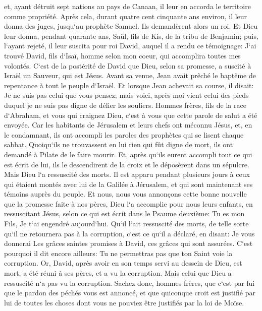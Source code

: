 \verse et, ayant détruit sept nations au pays de Canaan, il leur en accorda le territoire comme propriété. 
\verse Après cela, durant quatre cent cinquante ans environ, il leur donna des juges, jusqu`au prophète Samuel. 
\verse Ils demandèrent alors un roi. Et Dieu leur donna, pendant quarante ans, Saül, fils de Kis, de la tribu de Benjamin; 
\verse puis, l`ayant rejeté, il leur suscita pour roi David, auquel il a rendu ce témoignage: J`ai trouvé David, fils d`Isaï, homme selon mon coeur, qui accomplira toutes mes volontés. 
\verse C`est de la postérité de David que Dieu, selon sa promesse, a suscité à Israël un Sauveur, qui est Jésus. 
\verse Avant sa venue, Jean avait prêché le baptême de repentance à tout le peuple d`Israël. 
\verse Et lorsque Jean achevait sa course, il disait: Je ne suis pas celui que vous pensez; mais voici, après moi vient celui des pieds duquel je ne suis pas digne de délier les souliers. 
\verse Hommes frères, fils de la race d`Abraham, et vous qui craignez Dieu, c`est à vous que cette parole de salut a été envoyée. 
\verse Car les habitants de Jérusalem et leurs chefs ont méconnu Jésus, et, en le condamnant, ils ont accompli les paroles des prophètes qui se lisent chaque sabbat. 
\verse Quoiqu`ils ne trouvassent en lui rien qui fût digne de mort, ils ont demandé à Pilate de le faire mourir. 
\verse Et, après qu`ils eurent accompli tout ce qui est écrit de lui, ils le descendirent de la croix et le déposèrent dans un sépulcre. 
\verse Mais Dieu l`a ressuscité des morts. 
\verse Il est apparu pendant plusieurs jours à ceux qui étaient montés avec lui de la Galilée à Jérusalem, et qui sont maintenant ses témoins auprès du peuple. 
\verse Et nous, nous vous annonçons cette bonne nouvelle que la promesse faite à nos pères, 
\verse Dieu l`a accomplie pour nous leurs enfants, en ressuscitant Jésus, selon ce qui est écrit dans le Psaume deuxième: Tu es mon Fils, Je t`ai engendré aujourd`hui. 
\verse Qu`il l`ait ressuscité des morts, de telle sorte qu`il ne retournera pas à la corruption, c`est ce qu`il a déclaré, en disant: Je vous donnerai Les grâces saintes promises à David, ces grâces qui sont assurées. 
\verse C`est pourquoi il dit encore ailleurs: Tu ne permettras pas que ton Saint voie la corruption. 
\verse Or, David, après avoir en son temps servi au dessein de Dieu, est mort, a été réuni à ses pères, et a vu la corruption. 
\verse Mais celui que Dieu a ressuscité n`a pas vu la corruption. 
\verse Sachez donc, hommes frères, que c`est par lui que le pardon des péchés vous est annoncé, 
\verse et que quiconque croit est justifié par lui de toutes les choses dont vous ne pouviez être justifiés par la loi de Moïse. 
